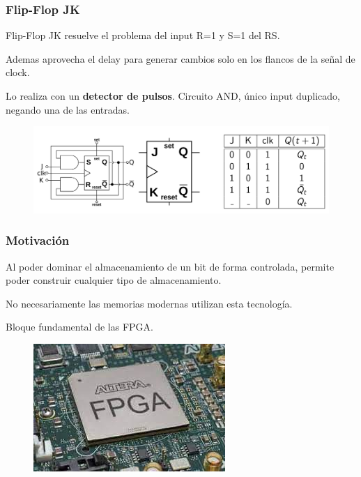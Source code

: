 \documentclass[10pt]{beamer}
\begin{document}
\begin{frame}
\frametitle{Flip-Flop JK}
Flip-Flop JK resuelve el problema del input R=1 y S=1 del RS.

Ademas aprovecha el delay para generar cambios solo en los flancos de la se\~nal de clock.

Lo realiza con un \textbf{detector de pulsos}. Circuito AND, único input duplicado,  negando una de las entradas.
\begin{figure}[h!]
    \centering
    \includegraphics[scale=0.2]{flipJK.png}
\end{figure}



\end{frame}
\begin{frame}
\frametitle{Motivación}

Al poder dominar el almacenamiento de un bit de forma controlada, permite poder construir
cualquier tipo de almacenamiento.

No necesariamente las memorias modernas utilizan esta tecnología.

Bloque fundamental de las  FPGA.

\begin{figure}[h!]
    \centering
    \includegraphics[scale=0.5]{fpga.jpeg}
\end{figure}
\end{frame}
\end{document}
